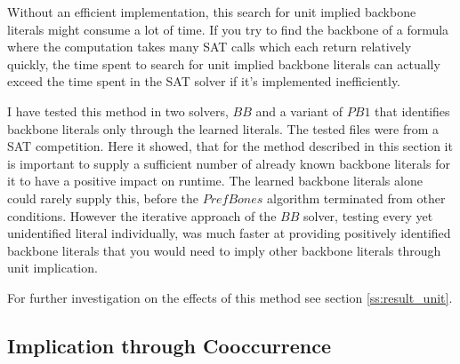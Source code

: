 \iffalse
fuer den fall dass platz generiert werden muss: den obigen algorithmus nochmal formell aufschreiben.
\begin{algorithm}
\caption{{\sc Iteratsadfaive algorithm (two tests per variable)}}
\label{alg:iterTwo}
\DontPrintSemicolon
\KwIn{A satisfiable formula $F$ in CNF}
\KwOut{All literals of the backbone of $F$ $\nu_r$}


\Return{$\nu_r$}\;
\end{algorithm}
\fi

Without an efficient implementation, this search for unit implied backbone literals might consume a lot of time. If you try to find the backbone of a formula where the computation takes many SAT calls which each return relatively quickly, the time spent to search for unit implied backbone literals can actually exceed the time spent in the SAT solver if it's implemented inefficiently.

I have tested this method in two solvers, $BB$ and a variant of $PB1$ that identifies backbone literals only through the learned literals. The tested files were from a SAT competition. Here it showed, that for the method described in this section it is important to supply a sufficient number of already known backbone literals for it to have a positive impact on runtime. The learned backbone literals alone could rarely supply this, before the $PrefBones$ algorithm terminated from other conditions. However the iterative approach of the $BB$ solver, testing every yet unidentified literal individually, was much faster at providing positively identified backbone literals that you would need to imply other backbone literals through unit implication.


For further investigation on the effects of this method see section \ref{ss:result_unit}.






\subsection{Implication through Cooccurrence}
\label{subsec:coocc}

